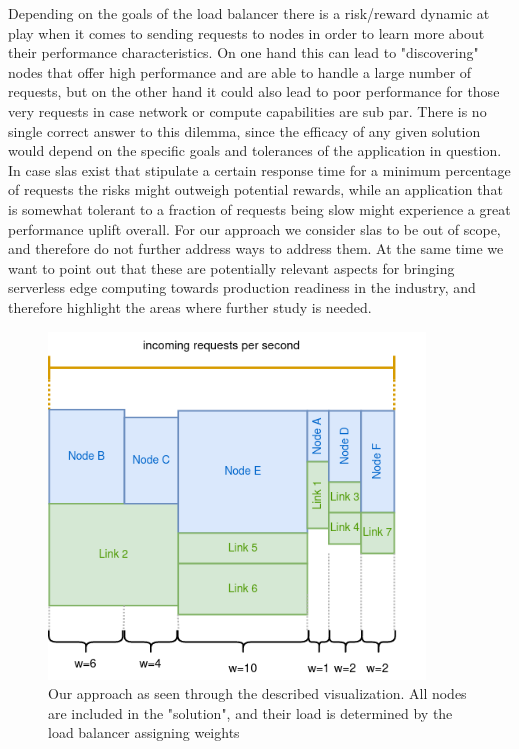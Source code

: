 \documentclass[draft,final]{vutinfth} %
\providecommand{\DIFaddtex}[1]{{\protect\color{blue}\uwave{#1}}} %
\providecommand{\DIFaddFL}[1]{\DIFadd{#1}} %
\providecommand{\DIFaddbeginFL}{} %
\providecommand{\DIFaddendFL}{} %
\providecommand{\DIFadd}[1]{\texorpdfstring{\DIFaddtex{#1}}{#1}} %
\begin{document}
Depending on the goals of the load balancer there is a risk/reward dynamic at play when it comes to sending requests to nodes in order to learn more about their performance characteristics. On one hand this can lead to "discovering" nodes that offer high performance and are able to handle a large number of requests, but on the other hand it could also lead to poor performance for those very requests in case network or compute capabilities are sub par.
There is no single correct answer to this dilemma, since the efficacy of any given solution would depend on the specific goals and tolerances of the application in question. In case \glspl{sla} exist that stipulate a certain response time for a minimum percentage of requests the risks might outweigh potential rewards, while an application that is somewhat tolerant to a fraction of requests being slow might experience a great performance uplift overall.
For our approach we consider \glspl{sla} to be out of scope, and therefore do not further address ways to address them. At the same time we want to point out that these are potentially relevant aspects for bringing serverless edge computing towards production readiness in the industry, and therefore highlight the areas where further study is needed.

\begin{figure}
    \centering
    \includegraphics[width=10cm]{graphics/diagrams/lb_weights.png}
    \caption{Our approach as seen through the described visualization. All nodes are included in the "solution", and their load is determined by the load balancer assigning weights \DIFaddbeginFL \DIFaddFL{(w)}\DIFaddendFL }
    \label{fig:lb_weights}
\end{figure}
\end{document}
